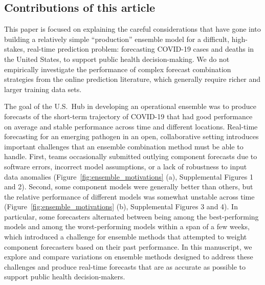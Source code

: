 \documentclass[11pt,3p,authoryear]{elsarticle}
\begin{document}
\subsection{Contributions of this article}


This paper is focused on explaining the careful considerations that have gone into building a relatively simple ``production'' ensemble model for a difficult, high-stakes, real-time prediction problem: forecasting COVID-19 cases and deaths in the United States, to support public health decision-making.
We do not empirically investigate the performance of complex forecast combination strategies from the online prediction literature, which generally require richer and larger training data sets.

The goal of the U.S.\ Hub in developing an operational ensemble was to produce forecasts of the short-term trajectory of COVID-19 that had good performance on average and stable performance across time and different locations.
Real-time forecasting for an emerging pathogen in an open, collaborative setting introduces important challenges that an ensemble combination method must be able to handle.
First, teams occasionally submitted outlying component forecasts due to software errors, incorrect model assumptions, or a lack of robustness to input data anomalies (Figure~\ref{fig:ensemble_motivations} (a), Supplemental Figures 1 and 2).
Second, some component models were generally better than others, but the relative performance of different models was somewhat unstable across time (Figure~\ref{fig:ensemble_motivations} (b), Supplemental Figures 3 and 4).
In particular, some forecasters alternated between being among the best-performing models and among the worst-performing models within a span of a few weeks, which introduced a challenge for ensemble methods that attempted to weight component forecasters based on their past performance.
In this manuscript, we explore and compare variations on ensemble methods designed to address these challenges and produce real-time forecasts that are as accurate as possible to support public health decision-makers.
\end{document}
